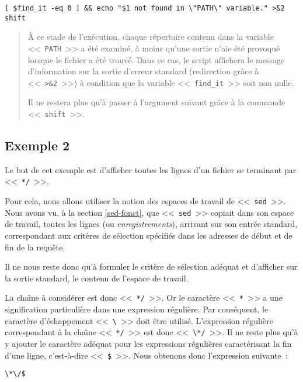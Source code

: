 \begin{verbatim}
[ $find_it -eq 0 ] && echo "$1 not found in \"PATH\" variable." >&2
shift
\end{verbatim}
\begin{quote}
{\`A} ce stade de l'ex{\'e}cution, chaque r{\'e}pertoire contenu dans la variable <<~{\tt PATH}~>> a {\'e}t{\'e} examin{\'e}, {\`a} moins qu'une sortie n'aie {\'e}t{\'e} provoqu{\'e} lorsque le fichier a {\'e}t{\'e} trouv{\'e}.
Dans ce cas, le script affichera le message d'information sur la sortie d'erreur standard (redirection gr{\^a}ce {\`a} <<~\verb=>&2=~>>) {\`a} condition que la variable <<~\verb=find_it=~>> soit non nulle.

Il ne restera plus qu'{\`a} passer {\`a} l'argument suivant gr{\^a}ce {\`a} la commande <<~\verb=shift=~>>.
\end{quote}


\subsection{\label{adv-fltrs-sed-ex2}Exemple 2}

Le but de cet exemple est d'afficher toutes les lignes d'un fichier se terminant par <<~\verb=*/=~>>.

Pour cela, nous allons utiliser la notion des espaces de travail de <<~{\tt sed}~>>.
Nous avons vu, {\`a} la section \ref{sed-fonct}, que <<~{\tt sed}~>> copiait dans son espace de travail, toutes les lignes (ou {\sl enregistrements}), arrivant sur son entr{\'e}e standard, correspondant aux crit{\`e}res de s{\'e}lection sp{\'e}cifi{\'e}s dans les adresses de d{\'e}but et de fin de la requ{\^e}te.

Il ne nous reste donc qu'{\`a} formuler le crit{\`e}re de s{\'e}lection ad{\'e}quat et d'afficher sur la sortie standard, le contenu de l'espace de travail.

La cha{\^\i}ne {\`a} consid{\'e}rer est donc <<~\verb=*/=~>>. Or le caract{\`e}re <<~\verb=*=~>> a une signification particuli{\`e}re dans une expression r{\'e}guli{\`e}re. Par cons{\'e}quent, le caract{\`e}re d'{\'e}chappement <<~\verb=\=~>> doit {\^e}tre utilis{\'e}. L'expression r{\'e}guli{\`e}re correspondant {\`a} la cha{\^\i}ne <<~\verb=*/=~>> est donc <<~\verb=\*/=~>>. Il ne reste plus qu'{\`a} y ajouter le caract{\`e}re ad{\'e}quat pour les expressions r{\'e}guli{\`e}res caract{\'e}risant la fin d'une ligne, c'est-{\`a}-dire <<~\verb=$=~>>. Nous obtenons donc l'expression suivante~:
\begin{center}
\verb=\*\/$=
\end{center}

